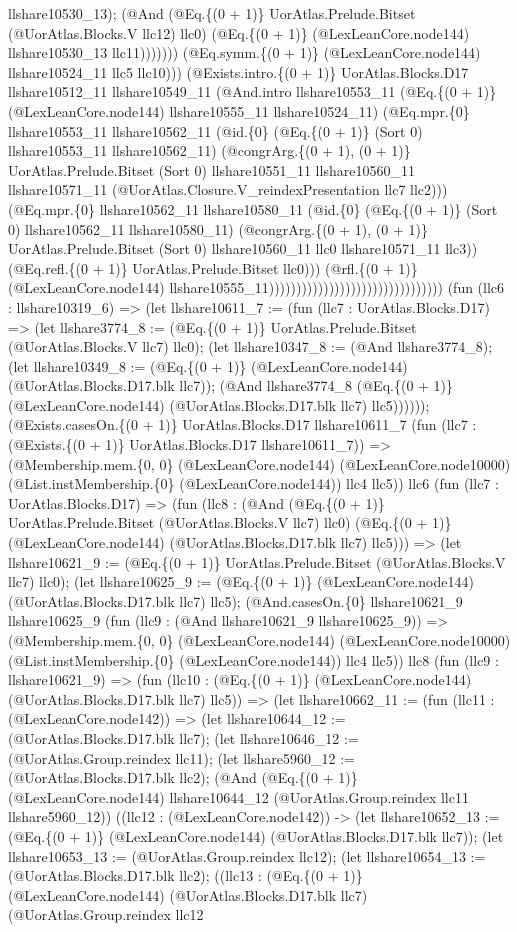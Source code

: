 \documentclass[11pt]{article}
\begin{document}
llshare10530\_13); (@And (@Eq.\{(0 + 1)\} UorAtlas.Prelude.Bitset (@UorAtlas.Blocks.V llc12) llc0) (@Eq.\{(0 + 1)\} (@LexLeanCore.node144) llshare10530\_13 llc11))))))) (@Eq.symm.\{(0 + 1)\} (@LexLeanCore.node144) llshare10524\_11 llc5 llc10))) (@Exists.intro.\{(0 + 1)\} UorAtlas.Blocks.D17 llshare10512\_11 llshare10549\_11 (@And.intro llshare10553\_11 (@Eq.\{(0 + 1)\} (@LexLeanCore.node144) llshare10555\_11 llshare10524\_11) (@Eq.mpr.\{0\} llshare10553\_11 llshare10562\_11 (@id.\{0\} (@Eq.\{(0 + 1)\} (Sort 0) llshare10553\_11 llshare10562\_11) (@congrArg.\{(0 + 1), (0 + 1)\} UorAtlas.Prelude.Bitset (Sort 0) llshare10551\_11 llshare10560\_11 llshare10571\_11 (@UorAtlas.Closure.V\_reindexPresentation llc7 llc2))) (@Eq.mpr.\{0\} llshare10562\_11 llshare10580\_11 (@id.\{0\} (@Eq.\{(0 + 1)\} (Sort 0) llshare10562\_11 llshare10580\_11) (@congrArg.\{(0 + 1), (0 + 1)\} UorAtlas.Prelude.Bitset (Sort 0) llshare10560\_11 llc0 llshare10571\_11 llc3)) (@Eq.refl.\{(0 + 1)\} UorAtlas.Prelude.Bitset llc0))) (@rfl.\{(0 + 1)\} (@LexLeanCore.node144) llshare10555\_11)))))))))))))))))))))))))))))))) (fun (llc6 : llshare10319\_6) => (let llshare10611\_7 := (fun (llc7 : UorAtlas.Blocks.D17) => (let llshare3774\_8 := (@Eq.\{(0 + 1)\} UorAtlas.Prelude.Bitset (@UorAtlas.Blocks.V llc7) llc0); (let llshare10347\_8 := (@And llshare3774\_8); (let llshare10349\_8 := (@Eq.\{(0 + 1)\} (@LexLeanCore.node144) (@UorAtlas.Blocks.D17.blk llc7)); (@And llshare3774\_8 (@Eq.\{(0 + 1)\} (@LexLeanCore.node144) (@UorAtlas.Blocks.D17.blk llc7) llc5)))))); (@Exists.casesOn.\{(0 + 1)\} UorAtlas.Blocks.D17 llshare10611\_7 (fun (llc7 : (@Exists.\{(0 + 1)\} UorAtlas.Blocks.D17 llshare10611\_7)) => (@Membership.mem.\{0, 0\} (@LexLeanCore.node144) (@LexLeanCore.node10000) (@List.instMembership.\{0\} (@LexLeanCore.node144)) llc4 llc5)) llc6 (fun (llc7 : UorAtlas.Blocks.D17) => (fun (llc8 : (@And (@Eq.\{(0 + 1)\} UorAtlas.Prelude.Bitset (@UorAtlas.Blocks.V llc7) llc0) (@Eq.\{(0 + 1)\} (@LexLeanCore.node144) (@UorAtlas.Blocks.D17.blk llc7) llc5))) => (let llshare10621\_9 := (@Eq.\{(0 + 1)\} UorAtlas.Prelude.Bitset (@UorAtlas.Blocks.V llc7) llc0); (let llshare10625\_9 := (@Eq.\{(0 + 1)\} (@LexLeanCore.node144) (@UorAtlas.Blocks.D17.blk llc7) llc5); (@And.casesOn.\{0\} llshare10621\_9 llshare10625\_9 (fun (llc9 : (@And llshare10621\_9 llshare10625\_9)) => (@Membership.mem.\{0, 0\} (@LexLeanCore.node144) (@LexLeanCore.node10000) (@List.instMembership.\{0\} (@LexLeanCore.node144)) llc4 llc5)) llc8 (fun (llc9 : llshare10621\_9) => (fun (llc10 : (@Eq.\{(0 + 1)\} (@LexLeanCore.node144) (@UorAtlas.Blocks.D17.blk llc7) llc5)) => (let llshare10662\_11 := (fun (llc11 : (@LexLeanCore.node142)) => (let llshare10644\_12 := (@UorAtlas.Blocks.D17.blk llc7); (let llshare10646\_12 := (@UorAtlas.Group.reindex llc11); (let llshare5960\_12 := (@UorAtlas.Blocks.D17.blk llc2); (@And (@Eq.\{(0 + 1)\} (@LexLeanCore.node144) llshare10644\_12 (@UorAtlas.Group.reindex llc11 llshare5960\_12)) ((llc12 : (@LexLeanCore.node142)) -> (let llshare10652\_13 := (@Eq.\{(0 + 1)\} (@LexLeanCore.node144) (@UorAtlas.Blocks.D17.blk llc7)); (let llshare10653\_13 := (@UorAtlas.Group.reindex llc12); (let llshare10654\_13 := (@UorAtlas.Blocks.D17.blk llc2); ((llc13 : (@Eq.\{(0 + 1)\} (@LexLeanCore.node144) (@UorAtlas.Blocks.D17.blk llc7) (@UorAtlas.Group.reindex llc12 
\end{document}

